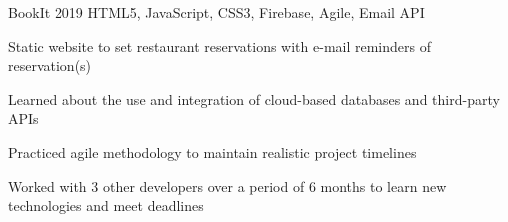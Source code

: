 \begin{cvprojects}
  \cvproject
  {BookIt}
  {\href{https://github.com/KevinIsMyName/BookIt}{\faGithubSquare\acvHeaderIconSep{}}}
  {2019}
  {HTML5, JavaScript, CSS3, Firebase, Agile, Email API}
  {
    \begin{cvitems}
      \item {Static website to set restaurant reservations with e-mail reminders of reservation(s)}
      \item {Learned about the use and integration of cloud-based databases and third-party APIs}
      \item {Practiced agile methodology to maintain realistic project timelines}
      \item {Worked with 3 other developers over a period of 6 months to learn new technologies and meet deadlines}
    \end{cvitems}
  }

\end{cvprojects}